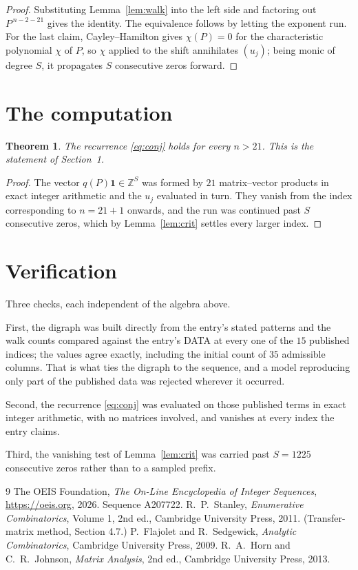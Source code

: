 \documentclass[11pt,a4paper]{article}
\theoremstyle{plain}
\newtheorem{theorem}{Theorem}
\theoremstyle{definition}
\begin{document}
\begin{proof}
Substituting Lemma~\ref{lem:walk} into the left side and factoring out
$P^{\,n-2-21}$ gives the identity. The equivalence follows by letting the exponent
run. For the last claim, Cayley--Hamilton gives $\chi(P)=0$ for the characteristic
polynomial $\chi$ of $P$, so $\chi$ applied to the shift annihilates $(u_j)$; being monic of
degree $S$, it propagates $S$ consecutive zeros forward.
\end{proof}

\section{The computation}

\begin{theorem}
The recurrence \eqref{eq:conj} holds for every $n>21$. This is the statement of
Section~1.
\end{theorem}

\begin{proof}
The vector $q(P)\mathbf{1}\in\mathbb{Z}^{S}$ was formed by $21$ matrix--vector
products in exact integer arithmetic and the $u_j$ evaluated in turn. They vanish from the
index corresponding to $n=21+1$ onwards, and the run was continued past $S$ consecutive
zeros, which by Lemma~\ref{lem:crit} settles every larger index.
\end{proof}

\section{Verification}

Three checks, each independent of the algebra above.

First, the digraph was built directly from the entry's stated patterns and the walk counts
compared against the entry's DATA at every one of the $15$ published indices; the
values agree exactly, including the initial count of $35$ admissible columns. That is
what ties the digraph to the sequence, and a model reproducing only part of the published
data was rejected wherever it occurred.

Second, the recurrence \eqref{eq:conj} was evaluated on those published terms in exact
integer arithmetic, with no matrices involved, and vanishes at every index the entry claims.

Third, the vanishing test of Lemma~\ref{lem:crit} was carried past $S=1225$ consecutive
zeros rather than to a sampled prefix.

\begin{thebibliography}{9}
 The OEIS Foundation, \emph{The On-Line Encyclopedia of Integer
Sequences}, \url{https://oeis.org}, 2026. Sequence A207722.
 R.~P.~Stanley, \emph{Enumerative Combinatorics}, Volume 1, 2nd ed.,
Cambridge University Press, 2011. (Transfer-matrix method, Section 4.7.)
 P.~Flajolet and R.~Sedgewick, \emph{Analytic Combinatorics}, Cambridge
University Press, 2009.
 R.~A.~Horn and C.~R.~Johnson, \emph{Matrix Analysis}, 2nd ed., Cambridge
University Press, 2013.
\end{thebibliography}
\end{document}

